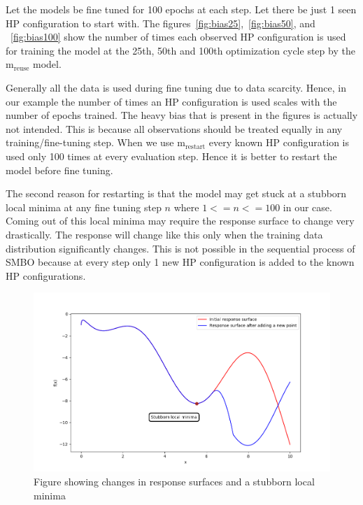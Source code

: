 \documentclass[12pt, twoside, ngerman]{report}
\begin{document}
Let the models be fine tuned for 100 epochs at each step.
Let there be just 1 seen HP configuration to start with.
The figures~\ref{fig:bias25},~\ref{fig:bias50},  and ~\ref{fig:bias100} show the number of times each observed HP configuration is used for training the model at the 25th, 50th and 100th optimization cycle step by the $\textrm{m}_{\textrm{reuse}}$ model.

Generally all the data is used during fine tuning due to data scarcity.
Hence,  in our example the number of times an HP configuration is used scales with the number of epochs trained.
The heavy bias that is present in the figures is actually not intended.
This is because all observations should be treated equally in any training/fine-tuning step.
When we use $\textrm{m}_{\textrm{restart}}$ every known HP configuration is used only 100 times at every evaluation step.
Hence it is better to restart the model before fine tuning.

The second reason for restarting is that the model may get stuck at a stubborn local minima at any fine tuning step $n$ where $1 <= n <= 100$ in our case.
Coming out of this local minima may require the response surface to change very drastically.
The response will change like this only when the training data distribution significantly changes.
This is not possible in the sequential process of SMBO because at every step only 1 new HP configuration is added to the known HP configurations.

\begin{figure}[htb]
  \centering
    \includegraphics[scale=0.45]{images/localMinima}
    \caption{Figure showing changes in response surfaces and a stubborn local minima}
    \label{fig:localMinima}
\end{figure}
\end{document}
